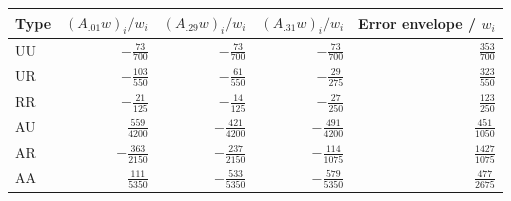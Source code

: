 \begin{center}\small
\begin{tabular}{@{}lrrrr@{}}
\toprule
Type & $(A_{.01}w)_i/w_i$ & $(A_{.29}w)_i/w_i$ & $(A_{.31}w)_i/w_i$ & Error envelope / $w_i$\\
\midrule
UU & $-\frac{73}{700}$ & $-\frac{73}{700}$ & $-\frac{73}{700}$ & $\frac{353}{700}$\\[5pt]
UR & $-\frac{103}{550}$ & $-\frac{61}{550}$ & $-\frac{29}{275}$ & $\frac{323}{550}$\\[5pt]
RR & $-\frac{21}{125}$ & $-\frac{14}{125}$ & $-\frac{27}{250}$ & $\frac{123}{250}$\\[5pt]
AU & $\frac{559}{4200}$ & $-\frac{421}{4200}$ & $-\frac{491}{4200}$ & $\frac{451}{1050}$\\[5pt]
AR & $-\frac{363}{2150}$ & $-\frac{237}{2150}$ & $-\frac{114}{1075}$ & $\frac{1427}{1075}$\\[5pt]
AA & $\frac{111}{5350}$ & $-\frac{533}{5350}$ & $-\frac{579}{5350}$ & $\frac{477}{2675}$\\[5pt]
\bottomrule
\end{tabular}\end{center}
